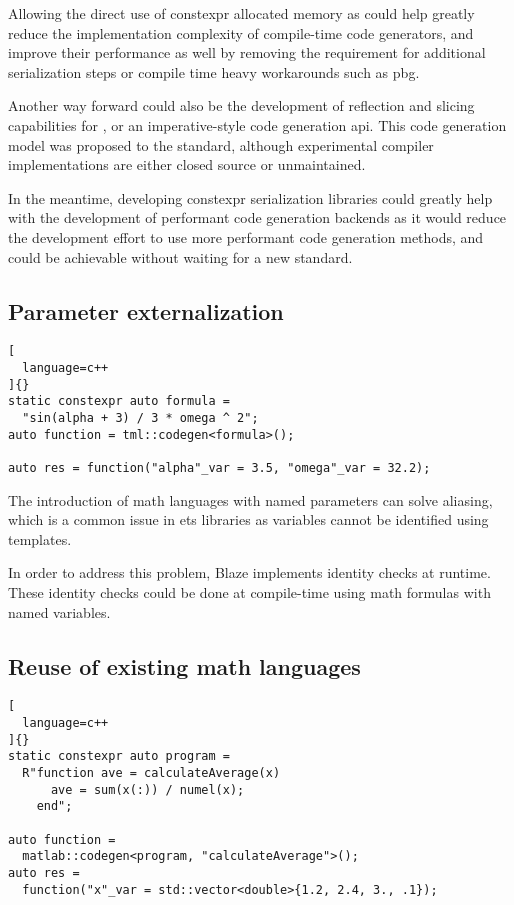 \documentclass[main]{subfiles}
\begin{document}
Allowing the direct use of \gls{constexpr} allocated memory as 
could help greatly reduce the implementation complexity of compile-time code
generators, and improve their performance as well by removing the requirement
for additional serialization steps or compile time heavy workarounds such as
\gls{pbg}.

Another way forward could also be the development of reflection and slicing
capabilities for \cpp, or an imperative-style code generation \gls{api}.
This code generation model was proposed to the \cpp standard, although
experimental compiler implementations are either closed source or unmaintained.

In the meantime, developing \gls{constexpr} serialization libraries could
greatly help with the development of performant code generation backends
as it would reduce the development effort to use more performant code generation
methods, and could be achievable without waiting for a new \cpp standard.

\subsection*{Parameter externalization}

\begin{lstlisting}[
  language=c++
]{}
static constexpr auto formula =
  "sin(alpha + 3) / 3 * omega ^ 2";
auto function = tml::codegen<formula>();

auto res = function("alpha"_var = 3.5, "omega"_var = 32.2);
\end{lstlisting}

The introduction of math languages with named parameters can solve aliasing,
which is a common issue in \glspl{et} libraries as variables cannot be
identified using \cpp templates.

In order to address this problem, Blaze implements identity
checks at runtime. These identity checks could be done at compile-time
using math formulas with named variables.

\subsection*{Reuse of existing math languages}

\begin{lstlisting}[
  language=c++
]{}
static constexpr auto program =
  R"function ave = calculateAverage(x)
      ave = sum(x(:)) / numel(x);
    end";

auto function =
  matlab::codegen<program, "calculateAverage">();
auto res =
  function("x"_var = std::vector<double>{1.2, 2.4, 3., .1});
\end{lstlisting}
\end{document}
